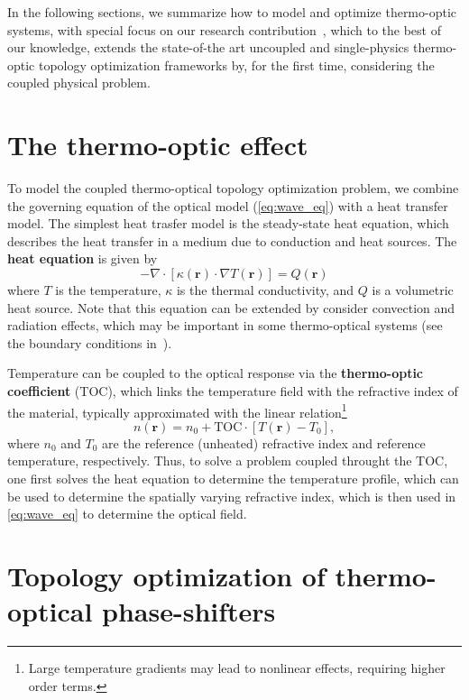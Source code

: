 In the following sections, we summarize how to model and optimize thermo-optic systems, 
with special focus on our research contribution~\cite{ownpub0}, which to the best of our knowledge,
extends the state-of-the art uncoupled and single-physics thermo-optic topology optimization frameworks by, for the first time, considering 
the coupled physical problem.

\section{The thermo-optic effect}

To model the coupled thermo-optical topology optimization problem, we combine the governing equation of the optical model (\eqref{eq:wave_eq})
with a heat transfer model. The simplest heat trasfer model is the steady-state heat equation, which describes the
heat transfer in a medium due to conduction and heat sources. The \textbf{heat equation} is given by
\begin{equation}\label{eq:heat}
    -\nabla \cdot \left[ \kappa(\mathbf{r})\cdot \nabla T(\mathbf{r}) \right] = Q(\mathbf{r})
\end{equation}
where $T$ is the temperature, $\kappa$ is the thermal conductivity, and $Q$ is a volumetric heat source. Note that this equation can be
extended by consider convection and radiation effects, which may be important in some thermo-optical systems (see the boundary conditions
in~\cite{ownpub0}).

Temperature can be coupled to the optical response via the \textbf{thermo-optic coefficient} (TOC), which links the temperature field
with the refractive index of the material, typically approximated with the linear relation\footnote{Large temperature gradients may lead to nonlinear effects, requiring higher order terms.}
\begin{equation}
n(\mathbf{r}) = n_0 + \text{TOC} \cdot \left[T(\mathbf{r}) - T_0\right],
\end{equation}
where $n_0$ and $T_0$ are the reference (unheated) refractive index and reference temperature, respectively. Thus, to solve a problem coupled throught the TOC, one first solves the heat equation
to determine the temperature profile, which can be used to determine
the spatially varying refractive index, which is then used in \eqref{eq:wave_eq} to determine the optical field.

\section{Topology optimization of thermo-optical phase-shifters~\cite{ownpub0}}\label{sec:TOPS}

